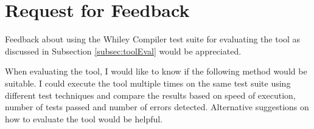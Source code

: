 \section{Request for Feedback}\label{section:feedback}


Feedback about using the Whiley Compiler test suite for evaluating the tool as discussed in Subsection \ref{subsec:toolEval} would be appreciated. 

When evaluating the tool, I would like to know if the following method would be suitable. I could execute the tool multiple times on the same test suite using different test techniques and compare the results based on speed of execution, number of tests passed and number of errors detected. 
Alternative suggestions on how to evaluate the tool would be helpful.